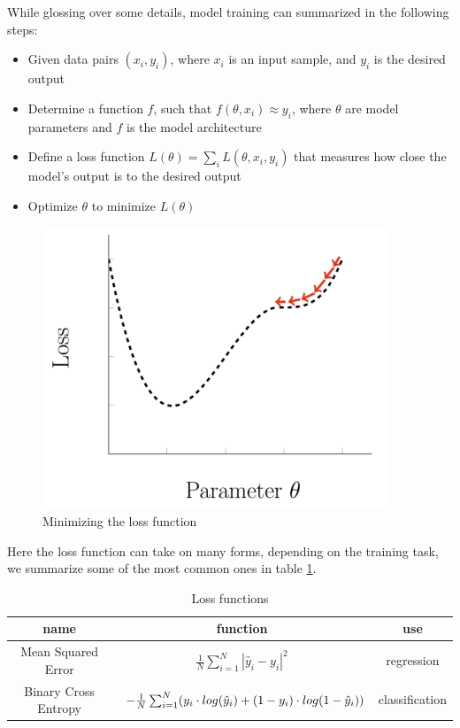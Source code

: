 While glossing over some details, model training can summarized in the following steps:
\begin{itemize}
    \item Given data pairs $(x_i, y_i)$, where $x_i$ is an input sample, and $y_i$ is the desired output
    \item Determine a function $f$, such that $f(\theta, x_i) \approx y_i$, where $\theta$ are model parameters and $f$ is the model architecture
    \item Define a loss function $L(\theta) = \sum_i L(\theta, x_i, y_i)$ that measures how close the model's output is to the desired output
    \item Optimize $\theta$ to minimize $L(\theta)$
\end{itemize}
\begin{figure}[h]
    \includegraphics[width=\linewidth]{chapters/NLP/figures/loss.png}
    \caption{Minimizing the loss function}
    \label{fig:loss}
\end{figure}
Here the loss function can take on many forms, depending on the training task, we summarize some of the most common ones in table \ref{table:losses}.
\begin{table}
    \centering
    \renewcommand{\arraystretch}{1.3}
    \begin{tabular}{|c| c| c|}
    name & function & use \\[0.5ex] \hline
    Mean Squared Error & $\begin{array} {lcl} \frac{1}{N} \sum_{i=1}^N|\hat{y}_i - y_i|^2\end{array}$  & regression \\ [0.5ex]
    Binary Cross Entropy& $\begin{array} {r@{}l@{}} -\frac{1}{N} \sum_{i=1}^N (y_i \cdot log(\hat{y}_i) + (1 - y_i) \cdot log(1-\hat{y}_i)) \end{array}$ & classification \\ [0.5ex]
    \end{tabular}
    \caption{Loss functions}
    \label{table:losses}
\end{table}
